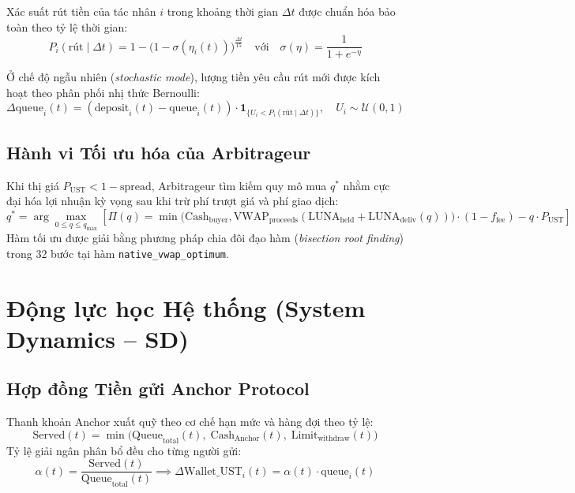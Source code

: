 \documentclass[11pt,a4paper]{article}
\begin{document}
Xác suất rút tiền của tác nhân $i$ trong khoảng thời gian $\Delta t$ được chuẩn hóa bảo toàn theo tỷ lệ thời gian:
\begin{equation}
P_i(\text{rút} \mid \Delta t) = 1 - \big(1 - \sigma(\eta_i(t))\big)^{\frac{\Delta t}{15}} \quad \text{với} \quad \sigma(\eta) = \frac{1}{1 + e^{-\eta}}
\end{equation}

Ở chế độ ngẫu nhiên (\textit{stochastic mode}), lượng tiền yêu cầu rút mới được kích hoạt theo phân phối nhị thức Bernoulli:
\begin{equation}
\Delta \text{queue}_i(t) = (\text{deposit}_i(t) - \text{queue}_i(t)) \cdot \mathbf{1}_{\{U_i < P_i(\text{rút} \mid \Delta t)\}}, \quad U_i \sim \mathcal{U}(0, 1)
\end{equation}

\subsection{Hành vi Tối ưu hóa của Arbitrageur}
Khi thị giá $P_{\text{UST}} < 1 - \text{spread}$, Arbitrageur tìm kiếm quy mô mua $q^*$ nhằm cực đại hóa lợi nhuận kỳ vọng sau khi trừ phí trượt giá và phí giao dịch:
\begin{equation}
q^* = \arg\max_{0 \le q \le q_{\max}} \left[ \Pi(q) = \min\big(\text{Cash}_{\text{buyer}}, \text{VWAP}_{\text{proceeds}}(\text{LUNA}_{\text{held}} + \text{LUNA}_{\text{deliv}}(q))\big) \cdot (1 - f_{\text{fee}}) - q \cdot P_{\text{UST}} \right]
\end{equation}
Hàm tối ưu được giải bằng phương pháp chia đôi đạo hàm (\textit{bisection root finding}) trong 32 bước tại hàm \texttt{native\_vwap\_optimum}.

\newpage
\section{Động lực học Hệ thống (System Dynamics -- SD)}

\subsection{Hợp đồng Tiền gửi Anchor Protocol}
Thanh khoản Anchor xuất quỹ theo cơ chế hạn mức và hàng đợi theo tỷ lệ:
\begin{equation}
\text{Served}(t) = \min\big(\text{Queue}_{\text{total}}(t), \; \text{Cash}_{\text{Anchor}}(t), \; \text{Limit}_{\text{withdraw}}(t)\big)
\end{equation}
Tỷ lệ giải ngân phân bổ đều cho từng người gửi:
\begin{equation}
\alpha(t) = \frac{\text{Served}(t)}{\text{Queue}_{\text{total}}(t)} \implies \Delta \text{Wallet\_UST}_i(t) = \alpha(t) \cdot \text{queue}_i(t)
\end{equation}
\end{document}
